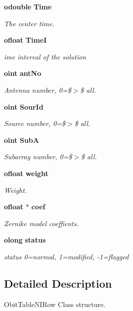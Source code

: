 \begin{CompactItemize}
{\bf odouble} {\bf Time}
\begin{CompactList}\small\item\em The center time. \item\end{CompactList}\item 
{\bf ofloat} {\bf Time\-I}
\begin{CompactList}\small\item\em ime interval of the solution \item\end{CompactList}\item 
{\bf oint} {\bf ant\-No}
\begin{CompactList}\small\item\em Antenna number, 0=\$$>$\$ all. \item\end{CompactList}\item 
{\bf oint} {\bf Sour\-Id}
\begin{CompactList}\small\item\em Source number, 0=\$$>$\$ all. \item\end{CompactList}\item 
{\bf oint} {\bf Sub\-A}
\begin{CompactList}\small\item\em Subarray number, 0=\$$>$\$ all. \item\end{CompactList}\item 
{\bf ofloat} {\bf weight}
\begin{CompactList}\small\item\em Weight. \item\end{CompactList}\item 
{\bf ofloat} $\ast$ {\bf coef}
\begin{CompactList}\small\item\em Zernike model coeffients. \item\end{CompactList}\item 
{\bf olong} {\bf status}
\begin{CompactList}\small\item\em status 0=normal, 1=modified, -1=flagged \item\end{CompactList}\end{CompactItemize}


\subsection{Detailed Description}
Obit\-Table\-NIRow Class structure. 




